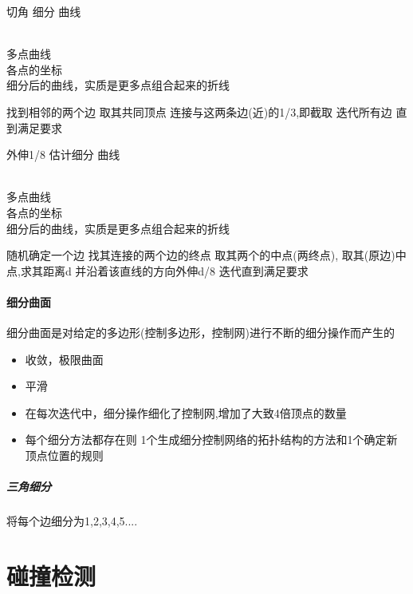 \documentclass[UTF8,a4paper,8pt]{ctexart}
\begin{document}
		 \begin{algorithm}[htb]
		 	\caption{切角 细分 曲线}
			\label{alg:CornerCut}
			\begin{algorithmic}[1]
				\REQUIRE ~~\\ 
				多点曲线 \\
				各点的坐标
				\ENSURE ~~\\
					细分后的曲线，实质是更多点组合起来的折线
										
				 \STATE 找到相邻的两个边
				 \STATE 取其共同顶点
				 \STATE 连接与这两条边(近)的1/3,即截取 
				 \STATE 迭代所有边
				 \STATE 直到满足要求
			\end{algorithmic}
		 \end{algorithm}
			 
		\begin{algorithm}[htb]
			\caption{外伸1/8 估计细分 曲线}
			\label{alg:Approximating Extends}
			\begin{algorithmic}[1]
				\REQUIRE ~~\\ 
				多点曲线 \\
				各点的坐标
				\ENSURE ~~\\
				细分后的曲线，实质是更多点组合起来的折线
				
				\STATE 随机确定一个边
				\STATE 找其连接的两个边的终点
				\STATE 取其两个的中点(两终点), 取其(原边)中点,求其距离d
				\STATE 并沿着该直线的方向外伸d/8 
				\STATE 迭代直到满足要求
			\end{algorithmic}
		\end{algorithm}
		
		\paragraph{细分曲面}细分曲面是对给定的多边形(控制多边形，控制网)进行不断的细分操作而产生的
			\begin{itemize}
				\item 收敛，极限曲面
				\item 平滑
				\item 在每次迭代中，细分操作细化了控制网,增加了大致4倍顶点的数量
				\item 每个细分方法都存在则 1个生成细分控制网络的拓扑结构的方法和1个确定新顶点位置的规则
			\end{itemize}
			\subparagraph{三角细分}
				将每个边细分为1,2,3,4,5....


\newpage				
\section{碰撞检测}
\end{document}
